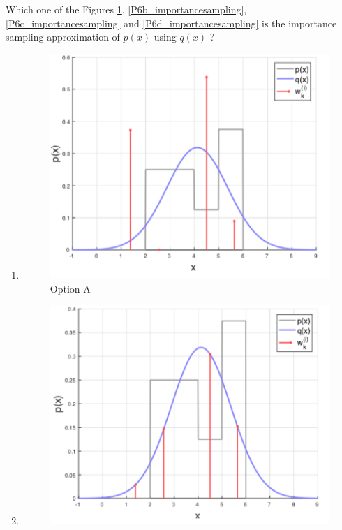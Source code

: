 \begin{enumerate}
Which one of the Figures \ref{P6a_importancesampling}, \ref{P6b_importancesampling}, \ref{P6c_importancesampling} and \ref{P6d_importancesampling} is the importance sampling approximation of $p(x)$ using $q(x)$ ?

\begin{enumerate}
\item \begin{figure}[!htb]
\begin{center}
\includegraphics[scale=0.320]{img/particle_filters/P6a_importancesampling.png}
\end{center}
\caption{Option A}
\label{P6a_importancesampling}
\end{figure}
\item \begin{figure}[!htb]
\begin{center}
\includegraphics[scale=0.320]{img/particle_filters/P6b_importancesampling.png}

\end{center}
\end{figure}
\end{enumerate}
\end{enumerate}
